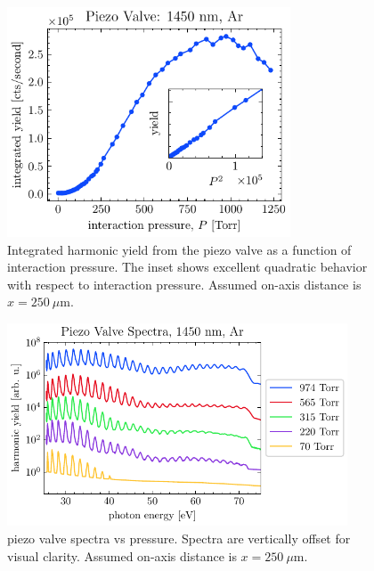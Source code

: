 \begin{figure}
	\centering
	\includegraphics[width=0.75\textwidth]{figures/chap3/piezovalve_pscan.pdf}
	\caption{Integrated harmonic yield from the piezo valve as a function of interaction pressure. The inset shows excellent quadratic behavior with respect to interaction pressure. Assumed on-axis distance is $x = 250 \ \mu \textrm{m}$.}
	\label{fig:piezovalve_pscan}
\end{figure}

\begin{figure}
	\centering
	\includegraphics[width=0.9\textwidth]{figures/chap3/piezovalve_spectra.pdf}
	\caption{piezo valve spectra vs pressure. Spectra are vertically offset for visual clarity. Assumed on-axis distance is $x = 250 \ \mu \textrm{m}$.}
	\label{fig:piezovalve_spectra}
\end{figure}

